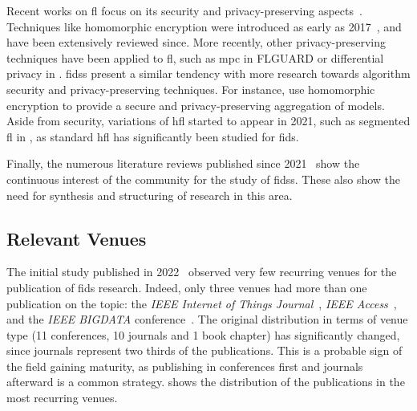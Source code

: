 Recent works on \gls{fl} focus on its security and privacy-preserving aspects~\cite{nguyen_PoisoningAttacksFederated_2020b,lyu_ThreatsFederatedLearning_2020,mothukuri_surveysecurityprivacy_2021}.
Techniques like homomorphic encryption were introduced as early as 2017~\cite{hardy_Privatefederatedlearning_2017}, and have been extensively reviewed since.
More recently, other privacy-preserving techniques have been applied to \gls{fl}, such as \gls{mpc} in FLGUARD
\cite{nguyen_FLGUARDSecurePrivate_2021} or differential privacy in \cite{kim_FederatedLearningLocal_2021}.
\Glspl{fids} present a similar tendency with more research towards algorithm security and privacy-preserving techniques.
For instance, \textcite{li_DeepFedFederatedDeep_2020} use homomorphic encryption to provide a secure and privacy-preserving aggregation of models.
Aside from security, variations of \gls{hfl} started to appear in 2021, such as segmented \gls{fl} in
\cite{sun_AdaptiveFederatedLearning_2020}, as standard \gls{hfl} has significantly been studied for \gls{fids}.

Finally, the numerous literature reviews published since 2021~\cite{agrawal_FederatedLearningIntrusion_2021,alazab_FederatedLearningCybersecurity_2021,campos_EvaluatingFederatedLearning_2022,lavaur_EvolutionFederatedLearningbased_2022,fedorchenko_ComparativeReviewIntrusion_2022,ghimire_RecentAdvancesFederated_2022,ismaila_ReviewApproachesFederated_2024} show the
continuous interest of the community for the study of \glspl{fids}.
These also show the need for synthesis and structuring of research in this area.


\subsection{Relevant Venues\label{sec:sota.quanti.venues}}

The initial study published in 2022~\cite{lavaur_EvolutionFederatedLearningbased_2022} observed very few recurring venues for the publication of \gls{fids} research.
Indeed, only three venues had more than one publication on the topic: the \emph{IEEE Internet of Things Journal}~\cite{popoola_FederatedDeepLearning_2021,zhang_BlockchainbasedFederatedLearning_2020}, \emph{IEEE
Access}~\cite{chen_IntrusionDetectionWireless_2020,li_DistributedNetworkIntrusion_2020}, and the \emph{IEEE BIGDATA} conference~\cite{cetin_FederatedWirelessNetwork_2019,fan_IoTDefenderFederatedTransfer_2020}.
The original distribution in terms of venue type (11 conferences, 10 journals and 1 book chapter) has significantly changed, since journals represent two thirds of the publications.
This is a probable sign of the field gaining maturity, as publishing in conferences first and journals afterward is a common strategy.
 shows the distribution of the publications in the most recurring venues.

